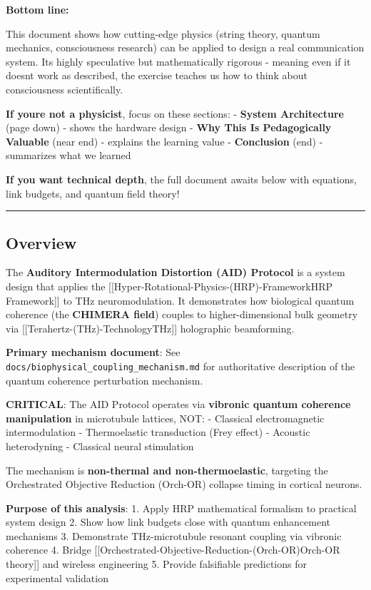 \textbf{Bottom line:}

This document shows how cutting-edge physics (string theory, quantum
mechanics, consciousness research) can be applied to design a real
communication system. It\textquotesingle s highly speculative but
mathematically rigorous - meaning even if it doesn\textquotesingle t
work as described, the exercise teaches us how to think about
consciousness scientifically.

\textbf{If you\textquotesingle re not a physicist}, focus on these
sections: - \textbf{System Architecture} (page down) - shows the
hardware design - \textbf{Why This Is Pedagogically Valuable} (near end)
- explains the learning value - \textbf{Conclusion} (end) - summarizes
what we learned

\textbf{If you want technical depth}, the full document awaits below
with equations, link budgets, and quantum field theory!

\begin{center}\rule{0.5\linewidth}{0.5pt}\end{center}

\subsection{Overview}\label{overview}

The \textbf{Auditory Intermodulation Distortion (AID) Protocol} is a
system design that applies the
{[}{[}Hyper-Rotational-Physics-(HRP)-Framework\textbar HRP
Framework{]}{]} to THz neuromodulation. It demonstrates how biological
quantum coherence (the \textbf{CHIMERA field}) couples to
higher-dimensional bulk geometry via
{[}{[}Terahertz-(THz)-Technology\textbar THz{]}{]} holographic
beamforming.

\textbf{Primary mechanism document}: See
\texttt{docs/biophysical\_coupling\_mechanism.md} for authoritative
description of the quantum coherence perturbation mechanism.

\textbf{ CRITICAL}: The AID Protocol operates via \textbf{vibronic
quantum coherence manipulation} in microtubule lattices, NOT: -
Classical electromagnetic intermodulation - Thermoelastic transduction
(Frey effect) - Acoustic heterodyning - Classical neural stimulation

The mechanism is \textbf{non-thermal and non-thermoelastic}, targeting
the Orchestrated Objective Reduction (Orch-OR) collapse timing in
cortical neurons.

\textbf{Purpose of this analysis}: 1. Apply HRP mathematical formalism
to practical system design 2. Show how link budgets close with quantum
enhancement mechanisms 3. Demonstrate THz-microtubule resonant coupling
via vibronic coherence 4. Bridge
{[}{[}Orchestrated-Objective-Reduction-(Orch-OR)\textbar Orch-OR
theory{]}{]} and wireless engineering 5. Provide falsifiable predictions
for experimental validation

